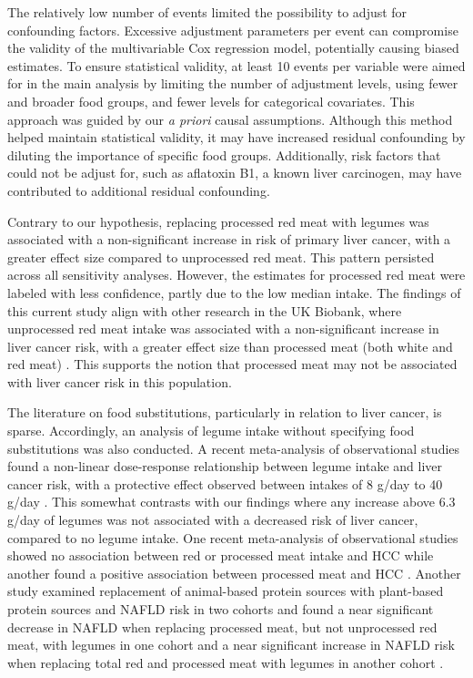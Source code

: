 \documentclass[nutrients,article,submit,moreauthors,pdftex]{Definitions/mdpi}
\begin{document}
The relatively low number of events limited the possibility to adjust
for confounding factors. Excessive adjustment parameters per event can
compromise the validity of the multivariable Cox regression model,
potentially causing biased estimates. To ensure statistical validity, at
least 10 events per variable were aimed for in the main analysis by
limiting the number of adjustment levels, using fewer and broader food
groups, and fewer levels for categorical covariates. This approach was
guided by our \emph{a priori} causal assumptions. Although this method helped
maintain statistical validity, it may have increased residual
confounding by diluting the importance of specific food groups.
Additionally, risk factors that could not be adjust for, such as
aflatoxin B1, a known liver carcinogen, may have contributed to
additional residual confounding.

Contrary to our hypothesis, replacing processed red meat with legumes
was associated with a non-significant increase in risk of primary liver
cancer, with a greater effect size compared to unprocessed red meat.
This pattern persisted across all sensitivity analyses. However, the
estimates for processed red meat were labeled with less confidence,
partly due to the low median intake. The findings of this current study
align with other research in the UK Biobank, where unprocessed red meat
intake was associated with a non-significant increase in liver cancer
risk, with a greater effect size than processed meat (both white and red
meat) \citep{Knuppel2020}. This supports the notion that processed meat may
not be associated with liver cancer risk in this population.

The literature on food substitutions, particularly in relation to liver
cancer, is sparse. Accordingly, an analysis of legume intake without
specifying food substitutions was also conducted. A recent meta-analysis
of observational studies found a non-linear dose-response relationship
between legume intake and liver cancer risk, with a protective effect
observed between intakes of 8 g/day to 40 g/day \citep{liu2023a}. This
somewhat contrasts with our findings where any increase above 6.3 g/day
of legumes was not associated with a decreased risk of liver cancer,
compared to no legume intake. One recent meta-analysis of observational
studies showed no association between red or processed meat intake and
HCC \citep{Di2023} while another found a positive association between
processed meat and HCC \citep{Yu2022}. Another study examined replacement of
animal-based protein sources with plant-based protein sources and NAFLD
risk in two cohorts and found a near significant decrease in NAFLD when
replacing processed meat, but not unprocessed red meat, with legumes in
one cohort and a near significant increase in NAFLD risk when replacing
total red and processed meat with legumes in another cohort
\citep{Zhang2023}.
\end{document}
